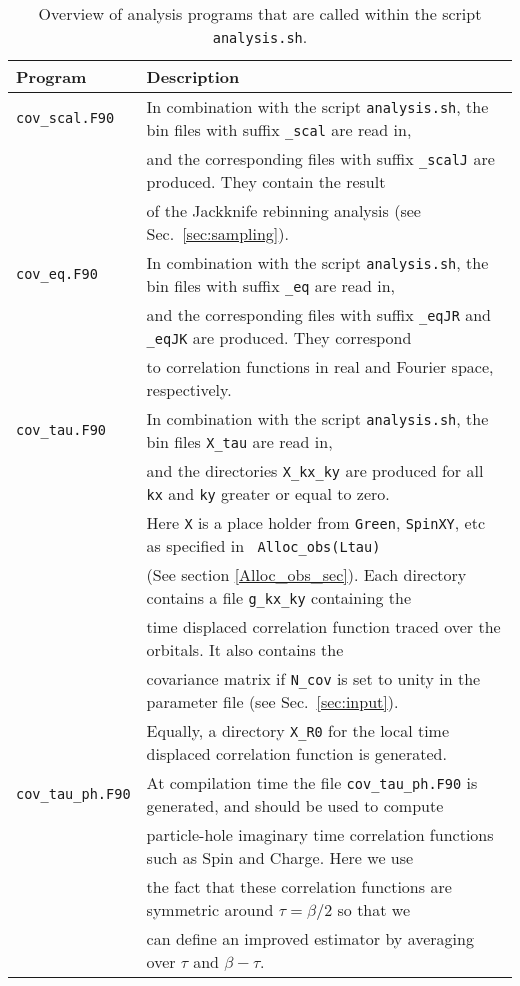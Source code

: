 \begin{table}[h]
	\begin{tabular}{@{} l l @{}}\toprule
		Program & Description \\\midrule
		\texttt{cov\_scal.F90}  &  In combination with the script \texttt{analysis.sh}, the bin files with suffix \texttt{\_scal} are read in, \\
		& and  the corresponding files with suffix \texttt{\_scalJ} are produced. They  contain the  result \\
		& of the Jackknife rebinning analysis  (see Sec.~\ref{sec:sampling}).  \\
		\texttt{cov\_eq.F90}    &  In combination with the script \texttt{analysis.sh}, the bin files with suffix \texttt{\_eq} are read in, \\
		& and the corresponding files with suffix  \texttt{\_eqJR}  and  \texttt{\_eqJK}  are produced. They  correspond \\
		& to correlation functions in real and Fourier space, respectively.  \\
		\texttt{cov\_tau.F90}   &  In combination with the script \texttt{analysis.sh}, the bin files  \texttt{X\_tau} are read in, \\
		& and the directories  \texttt{X\_kx\_ky} are produced  for all \texttt{kx} and \texttt{ky} greater or equal to zero. \\
		& Here \texttt{X}  is a place holder from \texttt{Green}, \texttt{SpinXY}, etc   as specified in \texttt{ Alloc\_obs(Ltau)} \\
		& (See section \ref{Alloc_obs_sec}). Each directory contains  a  file    \texttt{g\_kx\_ky}  containing the  \\
		& time displaced correlation function traced over the  orbitals.  It also contains the  \\
		& covariance matrix if \texttt{N\_cov} is set to unity in the parameter file  (see Sec.~\ref{sec:input}). \\
		& Equally, a directory  \texttt{X\_R0}  for the local  time displaced  correlation function is generated.  \\                         
		\texttt{cov\_tau\_ph.F90}            & At compilation time  the file \texttt{cov\_tau\_ph.F90} is generated, and  should be used to compute \\ 
		& particle-hole  imaginary time correlation functions such as Spin and Charge.   Here we use  \\
		&  the fact that these  correlation functions  are symmetric around $\tau = \beta/2$ so that we \\
		&  can define an improved estimator by averaging over $\tau$ and $\beta - \tau$.  
		\\\bottomrule
	\end{tabular}
	\caption{ Overview of analysis programs that are called within the script \texttt{analysis.sh}. \label{table:analysis_programs}}
\end{table}
